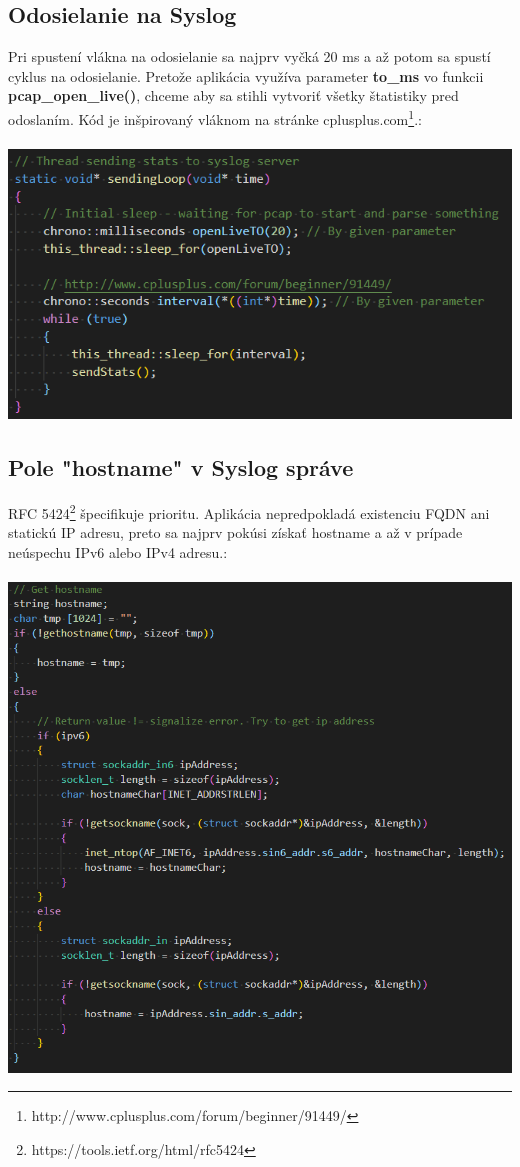 \documentclass{article}
\begin{document}
        \subsection{Odosielanie na Syslog}
        Pri spustení vlákna na odosielanie sa najprv vyčká 20 ms a až potom sa spustí cyklus na odosielanie. Pretože aplikácia využíva parameter \textbf{to\_ms}
        vo funkcii \textbf{pcap\_open\_live()}, chceme aby sa stihli vytvoriť všetky štatistiky pred odoslaním. Kód je inšpirovaný vláknom na stránke
        cplusplus.com\footnote{http://www.cplusplus.com/forum/beginner/91449/}.:\\\\
        \includegraphics[scale=0.6]{loop.png}
        

        \subsection{Pole "hostname" v Syslog správe}
        RFC 5424\footnote{https://tools.ietf.org/html/rfc5424} špecifikuje prioritu. Aplikácia nepredpokladá existenciu FQDN ani statickú IP adresu, preto
        sa najprv pokúsi získať hostname a až v prípade neúspechu IPv6 alebo IPv4 adresu.:\\\\
        \includegraphics[scale=0.5]{hostname.png}
\end{document}
